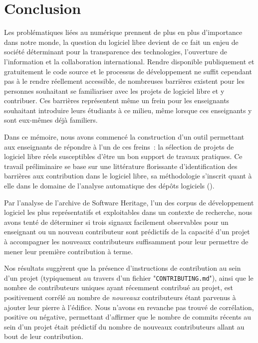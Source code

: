 \chapter*{Conclusion}

Les problématiques liées au numérique prennent de plus en plus d'importance dans notre monde, la question du
logiciel libre devient de ce fait un enjeu de société déterminant pour la transparence des technologies,
l'ouverture de l'information et la collaboration international. Rendre disponible publiquement et gratuitement
le code source et le processus de développement ne suffit cependant pas à le rendre réellement accessible, de
nombreuses barrières existent pour les personnes souhaitant se familiariser avec les projets de logiciel libre
et y contribuer. Ces barrières représentent même un frein pour les enseignants souhaitant introduire leurs
étudiants à ce milieu, même lorsque ces enseignants y sont eux-mêmes déjà familiers.

Dans ce mémoire, nous avons commencé la construction d'un outil permettant aux enseignants de répondre à l'un
de ces freins : la sélection de projets de logiciel libre réels susceptibles d'être un bon support de travaux
pratiques. Ce travail préliminaire se base sur une littérature florissante d'identification des barrières aux
contribution dans le logiciel libre, sa méthodologie s'inscrit quant à elle dans le domaine de l'analyse
automatique des dépôts logiciels (\href{https://conf.researchr.org/series/msr}{}).

Par l'analyse de l'archive de Software Heritage, l'un des corpus de développement logiciel les plus
représentatifs et exploitables dans un contexte de recherche, nous avons tenté de déterminer si trois signaux
facilement observables pour un enseignant ou un nouveau contributeur sont prédictifs de la capacité d'un
projet à accompagner les nouveaux contributeurs suffisamment pour leur permettre de mener leur première
contribution à terme.

Nos résultats suggèrent que la présence d'instructions de contribution au sein d'un projet (typiquement au
travers d'un fichier "\texttt{CONTRIBUTING.md}"), ainsi que le nombre de contributeurs uniques ayant récemment
contribué au projet, est positivement corrélé au nombre de \emph{nouveaux} contributeurs étant parvenus à
ajouter leur pierre à l'édifice. Nous n'avons en revanche pas trouvé de corrélation, positive ou négative,
permettant d'affirmer que le nombre de \glspl{commit} récents au sein d'un projet était prédictif du nombre de
nouveaux contributeurs allant au bout de leur contribution.

